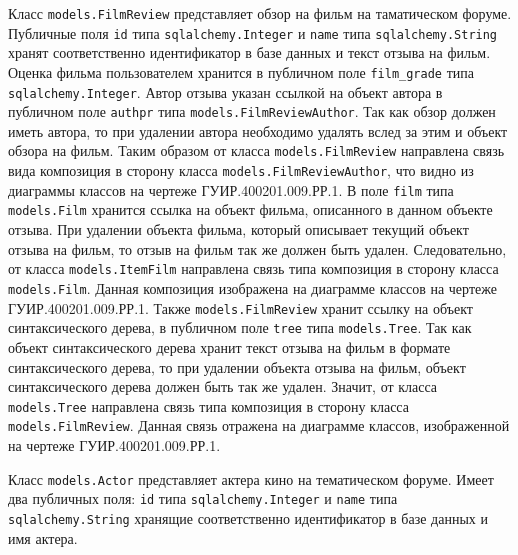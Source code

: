 Класс \texttt{models.FilmReview} представляет обзор на фильм на таматическом форуме. Публичные поля \texttt{id} типа \texttt{sqlalchemy.Integer} и \texttt{name} типа \texttt{sql\-alchemy.String} хранят соответственно идентификатор в базе данных и текст отзыва на фильм. Оценка фильма пользователем хранится в публичном поле \texttt{film\_grade} типа \texttt{sqlalchemy.Integer}. Автор отзыва указан ссылкой на объект автора в публичном поле \texttt{authpr} типа \texttt{models.FilmReviewAuthor}. Так как обзор должен иметь автора, то при удалении автора необходимо удалять вслед за этим и объект обзора на фильм. Таким образом от класса \texttt{models.Fi\-lmReview} направлена связь вида композиция в сторону класса \texttt{models.Film\-ReviewAuthor}, что видно из диаграммы классов на чертеже ГУИР.400201.0\-09.РР.1. В поле \texttt{film} типа \texttt{models.Film} хранится ссылка на объект фильма, описанного в данном объекте отзыва. При удалении объекта фильма, который описывает текущий объект отзыва на фильм, то отзыв на фильм так же должен быть удален. Следовательно, от класса \texttt{models.ItemFilm} направлена связь типа композиция в сторону класса \texttt{models.Film}. Данная композиция изображена на диаграмме классов на чертеже ГУИР.400201.009.РР.1. Также \texttt{models.FilmReview} хранит ссылку на объект синтаксического дерева, в публичном поле \texttt{tree} типа \texttt{models.Tree}. Так как объект синтаксического дерева хранит текст отзыва на фильм в формате синтаксического дерева, то при удалении объекта отзыва на фильм, объект синтаксического дерева должен быть так же удален. Значит, от класса \texttt{models.Tree} направлена связь типа композиция в сторону класса \texttt{models.FilmReview}. Данная связь отражена на диаграмме классов, изображенной на чертеже ГУИР.400201.009.РР.1.

Класс \texttt{models.Actor} представляет актера кино на тематическом форуме. Имеет два публичных поля: \texttt{id} типа \texttt{sqlalchemy.Integer} и \texttt{name} типа \texttt{sqlalchemy.String} хранящие соответственно идентификатор в базе данных и имя актера.

